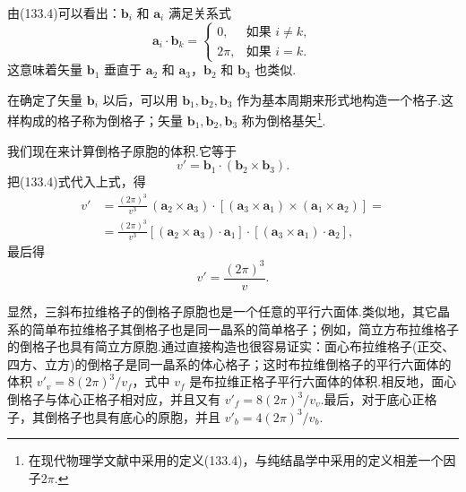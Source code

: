 由(133.4)可以看出：$\boldsymbol{b}_i$ 和 $\boldsymbol{a}_i$ 满足关系式
\begin{equation}
  \boldsymbol{a}_i\cdot\boldsymbol{b}_k=
  \begin{cases}
    0, & \text{如果 } i\neq k,\\
    2\pi, & \text{如果 } i=k.
  \end{cases}
\end{equation}
这意味着矢量 $\boldsymbol{b}_1$ 垂直于 $\boldsymbol{a}_2$ 和 $\boldsymbol{a}_3$，$\boldsymbol{b}_2$ 和 $\boldsymbol{b}_3$ 也类似.

在确定了矢量 $\boldsymbol{b}_i$ 以后，可以用 $\boldsymbol{b}_1,\boldsymbol{b}_2,\boldsymbol{b}_3$ 作为基本周期来形式地构造一个格子.这样构成的格子称为倒格子；矢量 $\boldsymbol{b}_1,\boldsymbol{b}_2,\boldsymbol{b}_3$ 称为倒格基矢\footnote{在现代物理学文献中采用的定义(133.4)，与纯结晶学中采用的定义相差一个因子$2\pi$.}.

我们现在来计算倒格子原胞的体积.它等于
\begin{equation*}
  v'=\boldsymbol{b}_1\cdot(\boldsymbol{b}_2\times\boldsymbol{b}_3).
\end{equation*}
把(133.4)式代入上式，得
\begin{equation*}
\begin{aligned}
  v'&=\frac{(2\pi)^3}{v^3}\,(\boldsymbol{a}_2\times\boldsymbol{a}_3)
  \cdot\left[(\boldsymbol{a}_3\times\boldsymbol{a}_1)
  \times(\boldsymbol{a}_1\times\boldsymbol{a}_2)\right]={}\\
  &=\frac{(2\pi)^3}{v^3}\left[(\boldsymbol{a}_2\times\boldsymbol{a}_3)
  \cdot\boldsymbol{a}_1\right]\cdot\left[(\boldsymbol{a}_3\times\boldsymbol{a}_1)
  \cdot\boldsymbol{a}_2\right],
\end{aligned}
\end{equation*}
最后得
\begin{equation}
  v'=\frac{(2\pi)^3}{v}.
\end{equation}

显然，三斜布拉维格子的倒格子原胞也是一个任意的平行六面体.类似地，其它晶系的简单布拉维格子其倒格子也是同一晶系的简单格子；例如，简立方布拉维格子的倒格子也具有简立方原胞.通过直接构造也很容易证实：面心布拉维格子(正交、四方、立方)的倒格子是同一晶系的体心格子；这时布拉维倒格子的平行六面体的体积 $v'_v=8(2\pi)^3/v_f$，式中 $v_f$ 是布拉维正格子平行六面体的体积.相反地，面心倒格子与体心正格子相对应，并且又有 $v'_f=8(2\pi)^3/v_v$.最后，对于底心正格子，其倒格子也具有底心的原胞，并且 $v'_b=4(2\pi)^3/v_b$.

